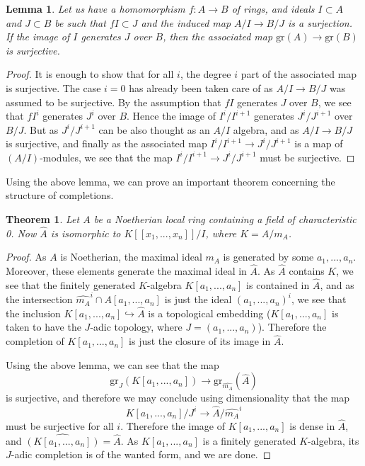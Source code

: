 \documentclass[12pt,a4paper,leqno]{article}
\newcommand{\gr}{\mathrm{gr}}
\theoremstyle{plain}
\newtheorem{thm}[theo]{Theorem}
\newtheorem{lem}[theo]{Lemma}
\theoremstyle{definition}
\theoremstyle{remark}
\begin{document}
\begin{lem}
Let us have a homomorphism $f: A \to B$ of rings, and ideals $I \subset A$ and $J \subset B$ be such that $fI \subset J$ and the induced map $A / I \to B / J$ is a surjection. If the image of $I$ generates $J$ over $B$, then the associated map $\gr (A) \to \gr (B)$ is surjective.
\end{lem}
\begin{proof}
It is enough to show that for all $i$, the degree $i$ part of the associated map is surjective. The case $i=0$ has already been taken care of as $A/I \to B/J$ was assumed to be surjective. By the assumption that $f I$ generates $J$ over $B$, we see that $f I^i$ generates $J^i$ over $B$. Hence the image of $I^i / I^{i+1}$ generates $J^i / J^{i+1}$ over $B/J$. But as $J^i / J^{i+1}$ can be also thought as an $A/I$ algebra, and as $A/I \to B/J$ is surjective, and finally as the associated map $I^i / I^{i+1} \to J^i / J^{i+1}$ is a map of $(A/I)$-modules, we see that the map $I^i / I^{i+1} \to J^i / J^{i+1}$ must be surjective.
\end{proof}

Using the above lemma, we can prove an important theorem concerning the structure of completions.

\begin{thm}
Let $A$ be a Noetherian local ring containing a field of characteristic 0. Now $\widehat A$ is isomorphic to $K[[x_1,...,x_n]]/I$, where $K = A/m_A$.
\end{thm}
\begin{proof}
As $A$ is Noetherian, the maximal ideal $m_A$ is generated by some $a_1,...,a_n$. Moreover, these elements generate the maximal ideal in $\widehat A$. As $\widehat A$ contains $K$, we see that the finitely generated $K$-algebra $K[a_1,...,a_n]$ is contained in $\widehat A$, and as the intersection $\widehat{m_A}^i \cap A[a_1,...,a_n]$ is just the ideal $(a_1,...,a_n)^i$, we see that the inclusion $K[a_1,...,a_n] \hookrightarrow \widehat A$ is a topological embedding ($K[a_1,...,a_n]$ is taken to have the $J$-adic topology, where $J = (a_1,...,a_n)$). Therefore the completion of $K[a_1,...,a_n]$ is just the closure of its image in $\widehat A$.

Using the above lemma, we can see that the map
\begin{equation*}
\gr_J(K[a_1,...,a_n]) \to \gr_{\widehat{m_A}}(\widehat{A})
\end{equation*}
is surjective, and therefore we may conclude using dimensionality that the map
\begin{equation*}
K[a_1,...,a_n] / J^i \to \widehat{A} / \widehat{m_A}^i
\end{equation*}
must be surjective for all $i$. Therefore the image of $K[a_1,...,a_n]$ is dense in $\widehat{A}$, and $\widehat{(K[a_1,...,a_n])} = \widehat A$. As $K[a_1,...,a_n]$ is a finitely generated $K$-algebra, its $J$-adic completion is of the wanted form, and we are done.
\end{proof}
\end{document}
